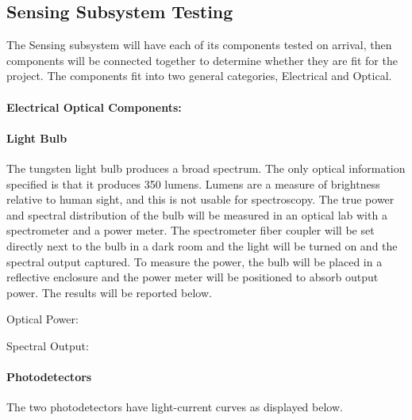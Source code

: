\subsection{Sensing Subsystem Testing}
\label{sec:sensing_subsystem_testing}

The Sensing subsystem will have each of its components tested on arrival, then components will be connected together to determine whether they are fit for the project. The components fit into two general categories, Electrical and Optical.

\paragraph{Electrical Optical Components:} 

\paragraph{Light Bulb} The tungsten light bulb produces a broad spectrum. The only optical information specified is that it produces 350 lumens. Lumens are a measure of brightness relative to human sight, and this is not usable for spectroscopy. The true power and spectral distribution of the bulb will be measured in an optical lab with a spectrometer and a power meter. The spectrometer fiber coupler will be set directly next to the bulb in a dark room and the light will be turned on and the spectral output captured. To measure the power, the bulb will be placed in a reflective enclosure and the power meter will be positioned to absorb output power. The results will be reported below.

Optical Power:

Spectral Output:

\paragraph{Photodetectors} The two photodetectors have light-current curves as displayed below.

